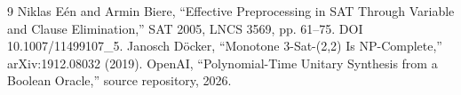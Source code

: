 \documentclass[11pt]{article}
\begin{document}
\begin{thebibliography}{9}
 Niklas E\'en and Armin Biere, ``Effective Preprocessing in SAT Through Variable and Clause Elimination,'' SAT 2005, LNCS 3569, pp. 61--75. DOI 10.1007/11499107\_5.
 Janosch D\"ocker, ``Monotone 3-Sat-(2,2) Is NP-Complete,'' arXiv:1912.08032 (2019).
 OpenAI, ``Polynomial-Time Unitary Synthesis from a Boolean Oracle,'' source repository, 2026.
\end{thebibliography}
\end{document}
